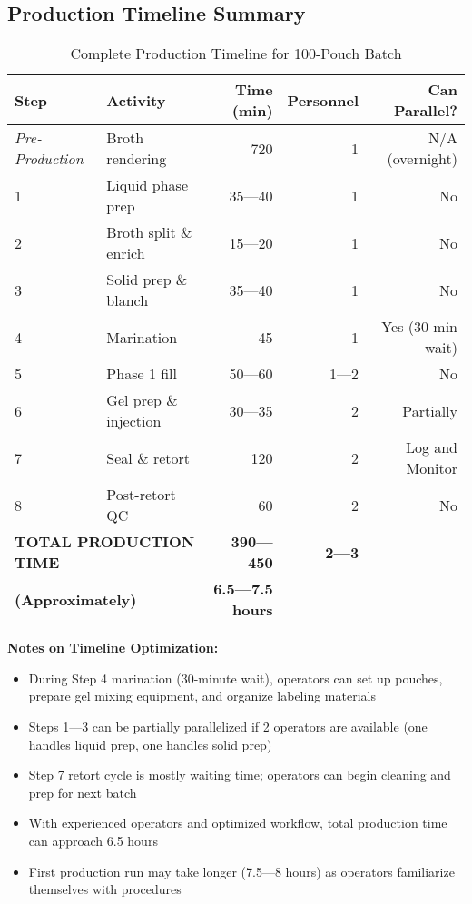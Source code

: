 {\begin{center}
\begin{tikzpicture}
\end{tikzpicture}
\end{center}


\clearpage
\subsection*{Production Timeline Summary}

\begin{table}[h]
\centering
\caption{Complete Production Timeline for 100-Pouch Batch}
\label{tab:timeline}
\begin{tabular}{@{}llrrr@{}}
\toprule
\textbf{Step} & \textbf{Activity} & \textbf{Time (min)} & \textbf{Personnel} & \textbf{Can Parallel?} \\
\midrule
\textit{Pre-Production} & Broth rendering & 720 & 1 & N/A (overnight) \\
\midrule
1 & Liquid phase prep & 35---40 & 1 & No \\
2 & Broth split \& enrich & 15---20 & 1 & No \\
3 & Solid prep \& blanch & 35---40 & 1 & No \\
4 & Marination & 45 & 1 & Yes (30 min wait) \\
5 & Phase 1 fill & 50---60 & 1---2 & No \\
6 & Gel prep \& injection & 30---35 & 2 & Partially \\
7 & Seal \& retort & 120 & 2 & Log and Monitor \\
8 & Post-retort QC & 60 & 2 & No \\
\midrule
\multicolumn{2}{l}{\textbf{TOTAL PRODUCTION TIME}} & \textbf{390---450} & \textbf{2---3} & \\
\multicolumn{2}{l}{\textbf{(Approximately)}} & \textbf{6.5---7.5 hours} & & \\
\bottomrule
\end{tabular}
\end{table}

\vspace{1em}
\noindent\textbf{Notes on Timeline Optimization:}
\begin{itemize}
\item During Step 4 marination (30-minute wait), operators can set up pouches, prepare gel mixing equipment, and organize labeling materials
\item Steps 1---3 can be partially parallelized if 2 operators are available (one handles liquid prep, one handles solid prep)
\item Step 7 retort cycle is mostly waiting time; operators can begin cleaning and prep for next batch
\item With experienced operators and optimized workflow, total production time can approach 6.5 hours
\item First production run may take longer (7.5---8 hours) as operators familiarize themselves with procedures
\end{itemize}

}
